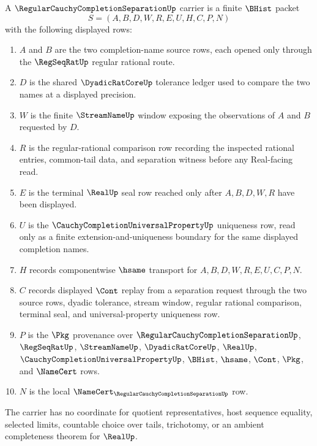 \begin{definition}
\label{def:regular-cauchy-completion-separation-carrier}
A $\RegularCauchyCompletionSeparationUp$ carrier is a finite $\BHist$ packet
$$
S=(A,B,D,W,R,E,U,H,C,P,N)
$$
with the following displayed rows:
\begin{enumerate}
\item $A$ and $B$ are the two completion-name source rows, each opened only through the $\RegSeqRatUp$ regular rational route.
\item $D$ is the shared $\DyadicRatCoreUp$ tolerance ledger used to compare the two names at a displayed precision.
\item $W$ is the finite $\StreamNameUp$ window exposing the observations of $A$ and $B$ requested by $D$.
\item $R$ is the regular-rational comparison row recording the inspected rational entries, common-tail data, and separation witness before any Real-facing read.
\item $E$ is the terminal $\RealUp$ seal row reached only after $A,B,D,W,R$ have been displayed.
\item $U$ is the $\CauchyCompletionUniversalPropertyUp$ uniqueness row, read only as a finite extension-and-uniqueness boundary for the same displayed completion names.
\item $H$ records componentwise $\hsame$ transport for $A,B,D,W,R,E,U,C,P,N$.
\item $C$ records displayed $\Cont$ replay from a separation request through the two source rows, dyadic tolerance, stream window, regular rational comparison, terminal seal, and universal-property uniqueness row.
\item $P$ is the $\Pkg$ provenance over $\RegularCauchyCompletionSeparationUp$, $\RegSeqRatUp$, $\StreamNameUp$, $\DyadicRatCoreUp$, $\RealUp$, $\CauchyCompletionUniversalPropertyUp$, $\BHist$, $\hsame$, $\Cont$, $\Pkg$, and $\NameCert$ rows.
\item $N$ is the local $\NameCert_{\RegularCauchyCompletionSeparationUp}$ row.
\end{enumerate}
The carrier has no coordinate for quotient representatives, host sequence equality, selected limits, countable choice over tails, trichotomy, or an ambient completeness theorem for $\RealUp$.
\end{definition}

